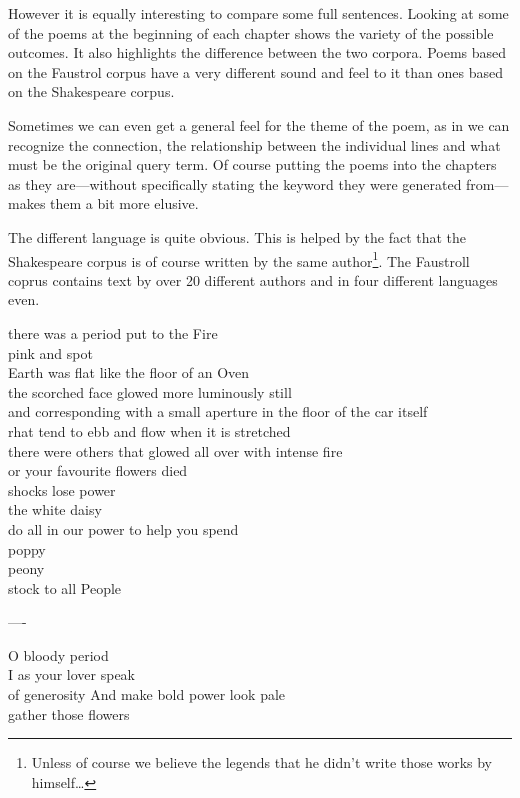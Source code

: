 \spirals

However it is equally interesting to compare some full sentences.
Looking at some of the poems at the beginning of each chapter shows the variety of the possible outcomes. It also highlights the difference between the two corpora. Poems based on the Faustrol corpus have a very different sound and feel to it than ones based on the Shakespeare corpus.

Sometimes we can even get a general feel for the theme of the poem, as in we can recognize the connection, the relationship between the individual lines and what must be the original query term. Of course putting the poems into the chapters as they are---without specifically stating the keyword they were generated from---makes them a bit more elusive.

The different language is quite obvious. This is helped by the fact that the Shakespeare corpus is of course written by the same author\footnote{Unless of course we believe the legends that he didn't write those works by himself\ldots}. The Faustroll coprus contains text by over 20 different authors and in four different languages even.

there was a period put to the Fire\\
pink and spot\\
Earth was flat like the floor of an Oven\\
the scorched face glowed more luminously still\\

and corresponding with a small aperture in the floor of the car itself\\
rhat tend to ebb and flow when it is stretched\\
there were others that glowed all over with intense fire\\
or your favourite flowers died\\

shocks lose power \\
the white daisy \\
do all in our power to help you spend\\

poppy \\
peony \\
stock to all People


----

O bloody period \\
I as your lover speak \\
of generosity And make bold power look pale \\
gather those flowers \\


